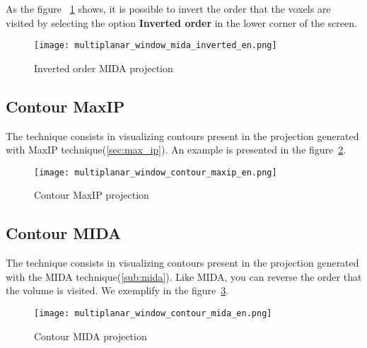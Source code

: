 As the figure ~\ref{fig:proj_MIDA_inv} shows, it is possible to invert the order that the voxels are visited by selecting the option \textbf{Inverted order} in the lower corner of the screen.

\begin{figure}[!h]
\centering
\texttt{[image: multiplanar\_window\_mida\_inverted\_en.png]}
\caption{Inverted order MIDA projection}
\label{fig:proj_MIDA_inv}
\end{figure}

\subsection{Contour MaxIP}

The technique consists in visualizing contours present in the projection generated with MaxIP technique(\ref{sec:max_ip}). An example is presented in the figure~\ref{fig:proj_contorno_maxip}.

\begin{figure}[!h]
\centering
\texttt{[image: multiplanar\_window\_contour\_maxip\_en.png]}
\caption{Contour MaxIP projection}
\label{fig:proj_contorno_maxip}
\end{figure}

\subsection{Contour MIDA}

The technique consists in visualizing contours present in the projection generated with the MIDA technique(\ref{sub:mida}). Like MIDA, you can reverse the order that the volume is visited. We exemplify in the figure~\ref{fig:proj_contorno_mida}.

\begin{figure}[!h]
\centering
\texttt{[image: multiplanar\_window\_contour\_mida\_en.png]}
\caption{Contour MIDA projection}
\label{fig:proj_contorno_mida}
\end{figure}